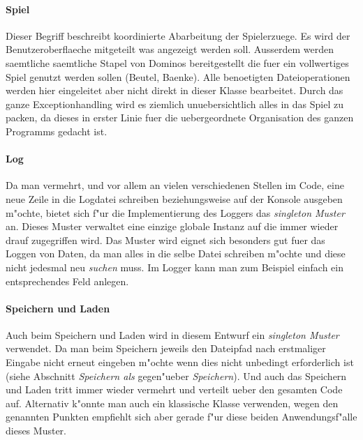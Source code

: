 \paragraph{Spiel}
Dieser Begriff beschreibt koordinierte Abarbeitung der Spielerzuege. Es wird der Benutzeroberflaeche mitgeteilt was angezeigt werden soll. Ausserdem werden saemtliche saemtliche Stapel von Dominos bereitgestellt die fuer ein vollwertiges Spiel genutzt werden sollen (Beutel, Baenke). Alle benoetigten Dateioperationen werden hier eingeleitet aber nicht direkt in dieser Klasse bearbeitet. Durch das ganze Exceptionhandling wird es ziemlich unuebersichtlich alles in das Spiel zu packen, da dieses in erster Linie fuer die uebergeordnete Organisation des ganzen Programms gedacht ist. 

\paragraph{Log}
Da man vermehrt, und vor allem an vielen verschiedenen Stellen im Code, eine neue Zeile in die Logdatei schreiben beziehungsweise auf der Konsole ausgeben m"ochte, bietet sich f"ur die Implementierung des Loggers das \emph{singleton Muster} an. Dieses Muster verwaltet eine einzige globale Instanz auf die immer wieder drauf zugegriffen wird. Das Muster wird eignet sich besonders gut fuer das Loggen von Daten, da man alles in die selbe Datei schreiben m"ochte und diese nicht jedesmal neu \emph{suchen} muss. Im Logger kann man zum Beispiel einfach ein entsprechendes Feld anlegen. 

\paragraph{Speichern und Laden}
Auch beim Speichern und Laden wird in diesem Entwurf ein \emph{singleton Muster} verwendet. Da man beim Speichern jeweils den Dateipfad nach erstmaliger Eingabe nicht erneut eingeben m"ochte wenn dies nicht unbedingt erforderlich ist (siehe Abschnitt 
\emph{Speichern als} gegen"ueber \emph{Speichern}). Und auch das Speichern und Laden tritt immer wieder vermehrt und verteilt ueber den gesamten Code auf. Alternativ k"onnte man auch ein klassische Klasse verwenden, wegen den genannten Punkten empfiehlt sich aber gerade f"ur diese beiden Anwendungsf"alle dieses Muster. 

